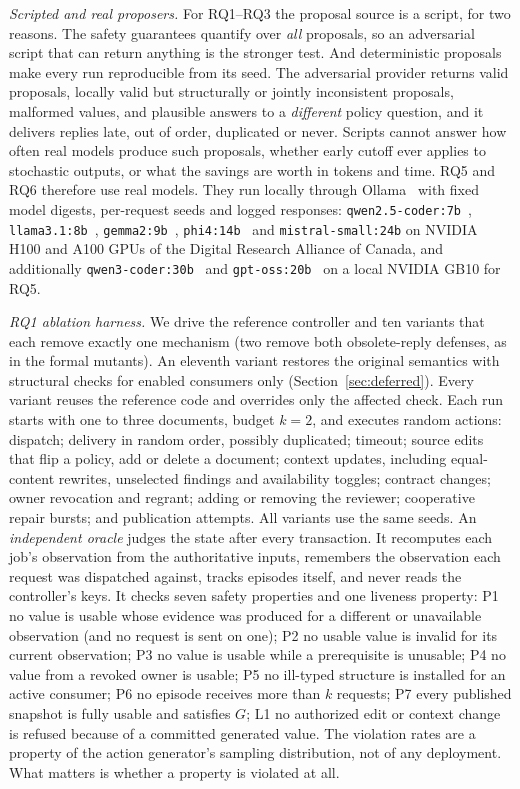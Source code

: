 \emph{Scripted and real proposers.} For RQ1--RQ3 the proposal source is a script, for two reasons. The safety guarantees quantify over \emph{all} proposals, so an adversarial script that can return anything is the stronger test. And deterministic proposals make every run reproducible from its seed. The adversarial provider returns valid proposals, locally valid but structurally or jointly inconsistent proposals, malformed values, and plausible answers to a \emph{different} policy question, and it delivers replies late, out of order, duplicated or never. Scripts cannot answer how often real models produce such proposals, whether early cutoff ever applies to stochastic outputs, or what the savings are worth in tokens and time. RQ5 and RQ6 therefore use real models. They run locally through Ollama~\cite{ollama} with fixed model digests, per-request seeds and logged responses: \texttt{qwen2.5-coder:7b}~\cite{hui2024qwen25coder}, \texttt{llama3.1:8b}~\cite{grattafiori2024llama3}, \texttt{gemma2:9b}~\cite{gemma2024gemma2}, \texttt{phi4:14b}~\cite{abdin2024phi4} and \texttt{mistral-small:24b} on NVIDIA H100 and A100 GPUs of the Digital Research Alliance of Canada, and additionally \texttt{qwen3-coder:30b}~\cite{yang2025qwen3} and \texttt{gpt-oss:20b}~\cite{openai2025gptoss} on a local NVIDIA GB10 for RQ5.

\emph{RQ1 ablation harness.} We drive the reference controller and ten variants that each remove exactly one mechanism (two remove both obsolete-reply defenses, as in the formal mutants). An eleventh variant restores the original semantics with structural checks for enabled consumers only (Section~\ref{sec:deferred}). Every variant reuses the reference code and overrides only the affected check. Each run starts with one to three documents, budget $k=2$, and executes \AblSteps{} random actions: dispatch; delivery in random order, possibly duplicated; timeout; source edits that flip a policy, add or delete a document; context updates, including equal-content rewrites, unselected findings and availability toggles; contract changes; owner revocation and regrant; adding or removing the reviewer; cooperative repair bursts; and publication attempts. All variants use the same \AblRuns{} seeds. An \emph{independent oracle} judges the state after every transaction. It recomputes each job's observation from the authoritative inputs, remembers the observation each request was dispatched against, tracks episodes itself, and never reads the controller's keys. It checks seven safety properties and one liveness property:
P1 no value is usable whose evidence was produced for a different or unavailable observation (and no request is sent on one);
P2 no usable value is invalid for its current observation;
P3 no value is usable while a prerequisite is unusable;
P4 no value from a revoked owner is usable;
P5 no ill-typed structure is installed for an active consumer;
P6 no episode receives more than $k$ requests;
P7 every published snapshot is fully usable and satisfies $G$;
L1 no authorized edit or context change is refused because of a committed generated value.
The violation rates are a property of the action generator's sampling distribution, not of any deployment. What matters is whether a property is violated at all.

